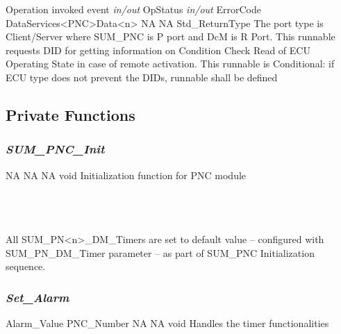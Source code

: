 {Operation invoked event}
{\textit{in/out} \hspace*{1.2in} \vrule \hspace*{0.1in} OpStatus \newline \textit{in/out} \hspace*{1.2in} \vrule \hspace*{0.1in} ErrorCode}
{DataServices<PNC>Data<n>}
{NA}
{NA}
{Std_ReturnType}
{The port type is Client/Server where SUM_PNC is P port and DcM is R Port. This runnable requests DID for getting information on Condition Check Read of ECU Operating State in case of remote activation. This runnable is Conditional: if ECU type does not prevent the DIDs, runnable shall be defined}

{ }

\subsection{Private Functions}

\subsubsection{\textit{SUM_PNC_Init}}


{NA}
{NA}
{NA}
{void}
{Initialization function for PNC module}

{ }
\\
\\
\\
All SUM_PN<n>_DM_Timers are set to default value – configured with SUM_PN_DM_Timer parameter – as part of SUM_PNC Initialization sequence.
\\
{}

\subsubsection{\textit{Set_Alarm}}

{ \hspace*{1.5in} \vrule \hspace*{0.1in} Alarm_Value \newline {} \hspace*{1.5in} \vrule \hspace*{0.1in} PNC_Number}
{NA}
{NA}
{void}
{Handles the timer functionalities}

